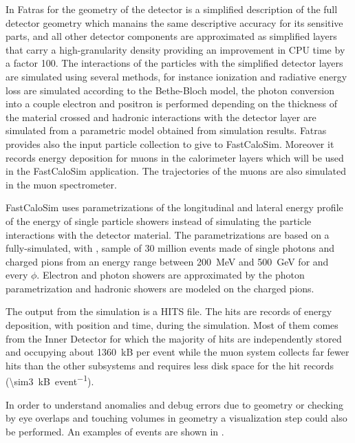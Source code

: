 In Fatras for the geometry of the detector is a simplified description of the full detector geometry which manains the same descriptive accuracy for its sensitive parts, and all other detector components are approximated as simplified layers that carry a high-granularity density providing an improvement in CPU time by a factor \num{100}. The interactions of the particles with the simplified detector layers are simulated using several methods, for instance ionization and radiative energy loss are simulated according to the Bethe-Bloch model, the photon conversion into a couple electron and positron is performed depending on the thickness of the material crossed and hadronic interactions with the detector layer are simulated from a parametric model obtained from \geant simulation results. Fatras provides also the input particle collection to give to FastCaloSim. Moreover it records energy deposition for muons in the calorimeter layers which will be used in the FastCaloSim application. The trajectories of the muons are also simulated in the muon spectrometer.

FastCaloSim uses parametrizations of the longitudinal and lateral energy profile of the energy of single particle showers instead of simulating the particle interactions with the detector material. The parametrizations are based on a fully-simulated, with \geant, sample of 30 million events made of single photons and charged pions from an energy range between \SI{200}{\MeV} and \SI{500}{\GeV} for  and every $\phi$. Electron and photon showers are approximated by the photon parametrization and hadronic showers are modeled on the charged pions.

The output from the simulation is a HITS file. The hits are records of energy deposition, with position and time, during the simulation. Most of them comes from the Inner Detector for which the majority of hits are independently stored and occupying about \SI{1360}{kB} per event while the muon system collects far fewer hits than the other subsystems and requires less disk space for the hit records (\SI{\sim3}{kB\per event}).

In order to understand anomalies and debug errors due to geometry or checking by eye overlaps and touching volumes in geometry a visualization step could also be performed. An examples of events are shown in \Fig{\ref{fig:simulation}}.

